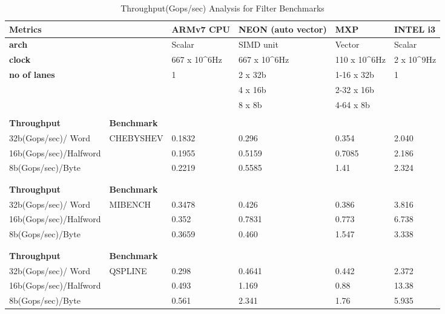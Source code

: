 \begin{table}[htbp]
	\centering
		\begin{adjustbox}{width=1\textwidth}
		\small
	\begin{tabular}{llllll}
		\toprule
		\textbf{Metrics} &   & \textbf{ARMv7 CPU} & \textbf{NEON (auto vector)} & \textbf{MXP} & \textbf{INTEL i3} \\
		\midrule
		\textbf{arch} &   & Scalar & SIMD unit & Vector & Scalar \\
		\textbf{clock} &   & 667 x 10^{6}Hz & 667 x 10^{6}Hz & 110 x 10^{6}Hz & 2 x 10^{9}Hz \\
		\textbf{no of lanes} &   & 1 & 2 x 32b & 1-16 x 32b & 1 \\
		&   &   & 4 x 16b & 2-32 x 16b &  \\
		&   &   & 8 x 8b & 4-64 x 8b &  \\
		&   &   &   &   &  \\
		\midrule
		 \textbf{Throughput} & \textbf{Benchmark} &   &   &   &  \\
		\midrule
		 32b(Gops/sec)/ Word   & CHEBYSHEV & 0.1832 & 0.296 & 0.354 & 2.040 \\
	 16b(Gops/sec)/Halfword &   & 0.1955 & 0.5159 & 0.7085 & 2.186 \\
		 8b(Gops/sec)/Byte &   & 0.2219 & 0.5585 & 1.41 & 2.324 \\
		   &   &   &   &   &  \\
		   &   &   &   &   &  \\
		\midrule
		 \textbf{Throughput} & \textbf{Benchmark} &   &   &   &  \\
		\midrule
		 32b(Gops/sec)/ Word   & MIBENCH & 0.3478 & 0.426 & 0.386 & 3.816 \\
		 16b(Gops/sec)/Halfword &   & 0.352 & 0.7831 & 0.773 & 6.738 \\
		 8b(Gops/sec)/Byte &   & 0.3659 & 0.460 & 1.547 & 3.338 \\
		  &   &   &   &   &  \\
		   &   &   &   &   &  \\
		\midrule
	 \textbf{Throughput} & \textbf{Benchmark} &   &   &   &  \\
		\midrule
	 32b(Gops/sec)/ Word   & QSPLINE & 0.298 & 0.4641 & 0.442 & 2.372 \\
	16b(Gops/sec)/Halfword &   & 0.493 & 1.169 & 0.88 & 13.38 \\
		 8b(Gops/sec)/Byte &   & 0.561 & 2.341 & 1.76 & 5.935 \\
		\bottomrule
	\end{tabular}%
    \end{adjustbox}%

		\caption{Throughput(Gops/sec) Analysis for Filter Benchmarks}
		\label{poly:d}%
\end{table}%